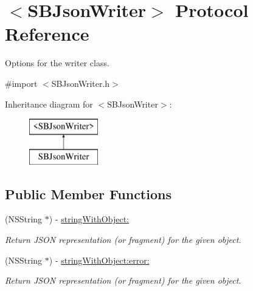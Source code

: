 \hypertarget{protocol_s_b_json_writer-p}{
\section{$<$SBJsonWriter$>$ Protocol Reference}
\label{protocol_s_b_json_writer-p}
}


Options for the writer class.  




{\ttfamily \#import $<$SBJsonWriter.h$>$}

Inheritance diagram for $<$SBJsonWriter$>$:\begin{figure}[H]
\begin{center}
\leavevmode
\includegraphics[height=2.000000cm]{protocol_s_b_json_writer-p}
\end{center}
\end{figure}
\subsection*{Public Member Functions}
\begin{DoxyCompactItemize}
\item 
(NSString $\ast$) -\/ \hyperlink{protocol_s_b_json_writer-p_a675b15e830d510b7fcd72f4e0a89ec45}{stringWithObject:}
\begin{DoxyCompactList}\small\item\em Return JSON representation (or fragment) for the given object. \item\end{DoxyCompactList}\item 
(NSString $\ast$) -\/ \hyperlink{protocol_s_b_json_writer-p_ac56a83a3dfc302b14199da325c662332}{stringWithObject:error:}
\begin{DoxyCompactList}\small\item\em Return JSON representation (or fragment) for the given object. \item\end{DoxyCompactList}\end{DoxyCompactItemize}
